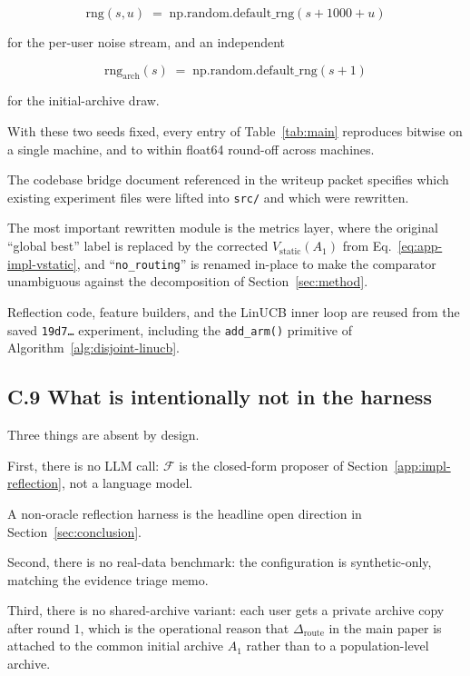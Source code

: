\documentclass{article} %
\begin{document}
\begin{equation}
\label{eq:app-impl-rngseed}
\text{rng}(s, u) \;=\; \mathrm{np.random.default\_rng}(s + 1000 + u)
\end{equation}

for the per-user noise stream, and an independent

\begin{equation}
\label{eq:app-impl-rngarch}
\text{rng}_{\text{arch}}(s) \;=\; \mathrm{np.random.default\_rng}(s + 1)
\end{equation}

for the initial-archive draw.

With these two seeds fixed, every entry of Table~\ref{tab:main} reproduces bitwise on a single machine, and to within float64 round-off across machines.

The codebase bridge document referenced in the writeup packet specifies which existing experiment files were lifted into \texttt{src/} and which were rewritten.

The most important rewritten module is the metrics layer, where the original ``global best'' label is replaced by the corrected $\widehat V_{\mathrm{static}}(A_1)$ from Eq.~\eqref{eq:app-impl-vstatic}, and ``\texttt{no\_routing}'' is renamed in-place to make the comparator unambiguous against the decomposition of Section~\ref{sec:method}.

Reflection code, feature builders, and the LinUCB inner loop are reused from the saved \texttt{19d7\ldots} experiment, including the \texttt{add\_arm()} primitive of Algorithm~\ref{alg:disjoint-linucb}.

\subsection{C.9 What is intentionally not in the harness}

\label{app:impl-not-included}

Three things are absent by design.

First, there is no LLM call: $\mathcal F$ is the closed-form proposer of Section~\ref{app:impl-reflection}, not a language model.

A non-oracle reflection harness is the headline open direction in Section~\ref{sec:conclusion}.

Second, there is no real-data benchmark: the configuration is synthetic-only, matching the evidence triage memo.

Third, there is no shared-archive variant: each user gets a private archive copy after round $1$, which is the operational reason that $\Delta_{\mathrm{route}}$ in the main paper is attached to the common initial archive $A_1$ rather than to a population-level archive.
\end{document}
